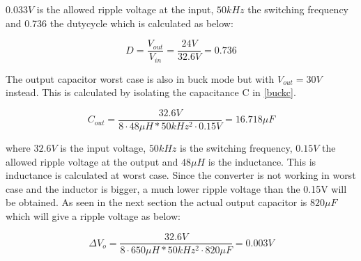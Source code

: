 $0.033V$ is the allowed ripple voltage at the input, $50kHz$ the switching frequency and 0.736 the dutycycle which is calculated as below:

\begin{equation}
D = \frac{V_{out}}{V_{in}} = \frac{24V}{32.6V} = 0.736
\end{equation} 


The output capacitor worst case is also in buck mode but with $V_{out}=30V$  instead. This is calculated by isolating the capacitance C in \ref{buckc}. 

\begin{equation} \label{buckc} 
C_{out} = \frac{32.6V}{8\cdot 48\mu H*50kHz^2\cdot 0.15V} = 16.718\mu F
\end{equation}

where $32.6V$ is the input voltage, $50kHz$ is the switching frequency, $0.15V$ the allowed ripple voltage at the output and $48\mu H$ is the inductance. This is inductance is calculated at worst case. 
Since the converter is not working in worst case and the inductor is bigger, a much lower ripple voltage than the 0.15V will be obtained. As seen in the next section the actual output capacitor is $820\mu F$ which will give a ripple voltage as below:

\begin{equation} \label{buckc} 
\Delta V_o = \frac{32.6V}{8\cdot 650\mu H*50kHz^2\cdot 820\mu F} = 0.003V
\end{equation}
   

